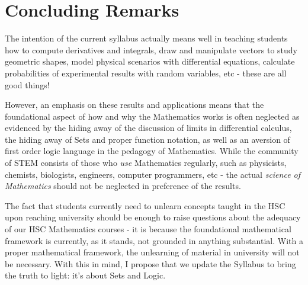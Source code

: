 \documentclass[11pt, a4paper, oneside]{article}
\begin{document}
\section{Concluding Remarks}
The intention of the current syllabus actually means well in teaching students how to compute derivatives and integrals, draw and manipulate vectors to study geometric shapes, model physical scenarios with differential equations, calculate probabilities of experimental results with random variables, etc - these are all good things!

However, an emphasis on these results and applications means that the foundational aspect of how and why the Mathematics works is often neglected as evidenced by the hiding away of the discussion of limits in differential calculus, the hiding away of Sets and proper function notation, as well as an aversion of first order logic language in the pedagogy of Mathematics. While the community of STEM consists of those who \emph{use} Mathematics regularly, such as physicists, chemists, biologists, engineers, computer programmers, etc - the actual \emph{science of Mathematics} should not be neglected in preference of the results.

The fact that students currently need to unlearn concepts taught in the HSC upon reaching university should be enough to raise questions about the adequacy of our HSC Mathematics courses - it is because the foundational mathematical framework is currently, as it stands, not grounded in anything substantial. With a proper mathematical framework, the unlearning of material in university will not be necessary. With this in mind, I propose that we update the Syllabus to bring the truth to light: it's about Sets and Logic.
\end{document}
